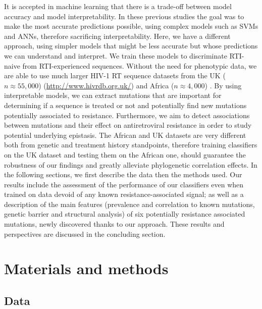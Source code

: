 \documentclass[
  11pt,
  twoside,
  BCOR=10mm,
  listof=totoc]{scrbook}
\begin{document}
It is accepted in machine learning that there is a trade-off between
model accuracy and model interpretability. In these previous studies the
goal was to make the most accurate predictions possible, using complex
models such as SVMs and ANNs, therefore sacrificing interpretability.
Here, we have a different approach, using simpler models that might be
less accurate but whose predictions we can understand and interpret. We
train these models to discriminate RTI-naive from RTI-experienced
sequences. Without the need for phenotypic data, we are able to use much
larger HIV-1 RT sequence datasets from the UK (\(n\approx55,000\))
(\url{http://www.hivrdb.org.uk/}) and Africa (\(n\approx4,000\))
\autocite{villabona-arenasIndepthAnalysisHIV12016}. By using interpretable
models, we can extract mutations that are important for determining if a
sequence is treated or not and potentially find new mutations
potentially associated to resistance. Furthermore, we aim to detect
associations between mutations and their effect on antiretroviral
resistance in order to study potential underlying epistasis. The African
and UK datasets are very different both from genetic and treatment
history standpoints, therefore training classifiers on the UK dataset
and testing them on the African one, should guarantee the robustness of
our findings and greatly alleviate phylogenetic correlation effects. In
the following sections, we first describe the data then the methods
used. Our results include the assessment of the performance of our
classifiers even when trained on data devoid of any known
resistance-associated signal; as well as a description of the main
features (prevalence and correlation to known mutations, genetic barrier
and structural analysis) of six potentially resistance associated
mutations, newly discovered thanks to our approach. These results and
perspectives are discussed in the concluding section.

\hypertarget{materials-and-methods}{%
\section{Materials and methods}\label{materials-and-methods}}

\hypertarget{data}{%
\subsection{Data}\label{data}}
\end{document}
